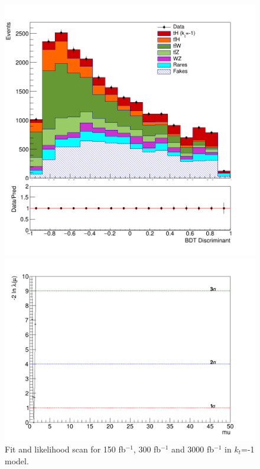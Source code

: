 \begin{figure}[!htbp]
		\begin{minipage}[b]{0.48\textwidth}
			\includegraphics[width=\textwidth]{Chapter4/kt-1/3000fb/simple-3000-kt-1.png}
		\end{minipage}
		\hfill
		\begin{minipage}[b]{0.48\textwidth}
			\includegraphics[width=\textwidth]{Chapter4/kt-1/3000fb/Likelihood.png}
		\end{minipage}
		\caption{Fit and likelihood scan for 150 fb$^{-1}$, 300 fb$^{-1}$ and 3000 fb$^{-1}$ in $k_t$=-1 model.}
		\label{hm1}
	\end{figure}
	
	
	
	
	
	

